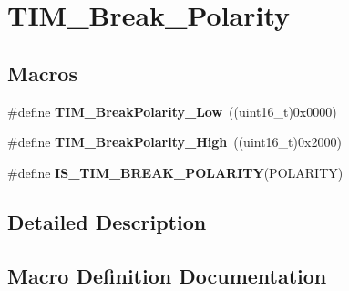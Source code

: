 \hypertarget{group___t_i_m___break___polarity}{}\section{T\+I\+M\+\_\+\+Break\+\_\+\+Polarity}
\label{group___t_i_m___break___polarity}
\subsection*{Macros}
\begin{DoxyCompactItemize}
\item 
\#define {\bfseries T\+I\+M\+\_\+\+Break\+Polarity\+\_\+\+Low}~((uint16\+\_\+t)0x0000)\hypertarget{group___t_i_m___break___polarity_ga565656ca81d17f9a1807afe3971dff6e}{}\label{group___t_i_m___break___polarity_ga565656ca81d17f9a1807afe3971dff6e}

\item 
\#define {\bfseries T\+I\+M\+\_\+\+Break\+Polarity\+\_\+\+High}~((uint16\+\_\+t)0x2000)\hypertarget{group___t_i_m___break___polarity_gabd4b72079548fd8903413a348539542b}{}\label{group___t_i_m___break___polarity_gabd4b72079548fd8903413a348539542b}

\item 
\#define {\bfseries I\+S\+\_\+\+T\+I\+M\+\_\+\+B\+R\+E\+A\+K\+\_\+\+P\+O\+L\+A\+R\+I\+TY}(P\+O\+L\+A\+R\+I\+TY)
\end{DoxyCompactItemize}


\subsection{Detailed Description}


\subsection{Macro Definition Documentation}
